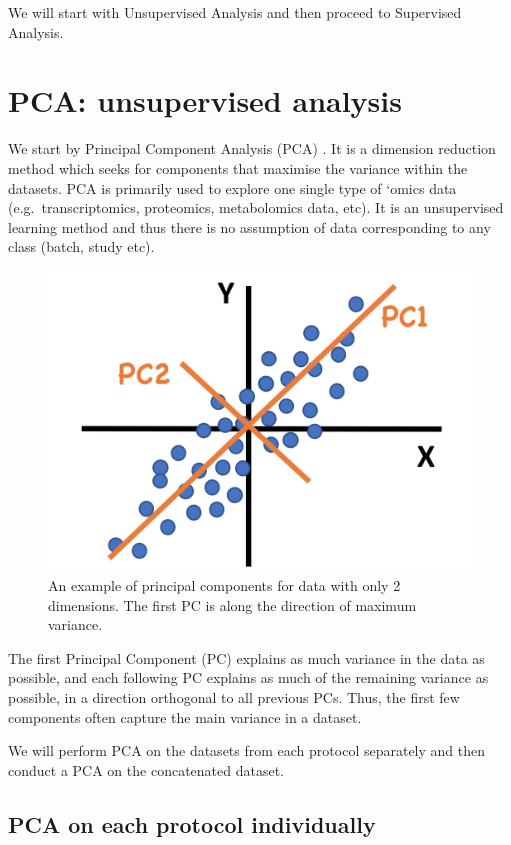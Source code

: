 \documentclass[]{book}
\theoremstyle{definition}
\theoremstyle{definition}
\theoremstyle{definition}
\theoremstyle{remark}
\begin{document}
We will start with Unsupervised Analysis and then proceed to Supervised
Analysis.

\hypertarget{pca-unsupervised-analysis}{%
\section{PCA: unsupervised analysis}\label{pca-unsupervised-analysis}}

We start by Principal Component Analysis (PCA) \citep{pca}. It is a
dimension reduction method which seeks for components that maximise the
variance within the datasets. PCA is primarily used to explore one
single type of `omics data (e.g.~transcriptomics, proteomics,
metabolomics data, etc). It is an unsupervised learning method and thus
there is no assumption of data corresponding to any class (batch, study
etc).

\begin{figure}[ht]

{\centering \includegraphics[width=0.4\linewidth]{figures/pca} 

}

\caption{An example of principal components for data with only 2 dimensions. The first PC is along the direction of maximum variance.}\label{fig:unnamed-chunk-14}
\end{figure}

The first Principal Component (PC) explains as much variance in the data
as possible, and each following PC explains as much of the remaining
variance as possible, in a direction orthogonal to all previous PCs.
Thus, the first few components often capture the main variance in a
dataset.

We will perform PCA on the datasets from each protocol separately and
then conduct a PCA on the concatenated dataset.

\hypertarget{pca-on-each-protocol-individually}{%
\subsection{PCA on each protocol
individually}\label{pca-on-each-protocol-individually}}
\end{document}
